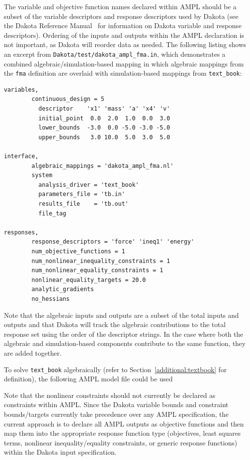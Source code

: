 The variable and objective function names declared within AMPL should
be a subset of the variable descriptors and response descriptors used
by Dakota (see the Dakota Reference Manual~\cite{RefMan} for information
on Dakota variable and response descriptors).  Ordering of the inputs
and outputs within the AMPL declaration is not important, as Dakota
will reorder data as needed.  The following listing shows an excerpt
from \texttt{Dakota/test/dakota\_ampl\_fma.in}, which demonstrates a
combined algebraic/simulation-based mapping in which algebraic
mappings from the \texttt{fma} definition are overlaid with
simulation-based mappings from \texttt{text\_book}:
\begin{center}
\begin{bigbox}
\begin{small}
\begin{verbatim}
variables,
        continuous_design = 5
          descriptor    'x1' 'mass' 'a' 'x4' 'v'
          initial_point  0.0  2.0  1.0  0.0  3.0
          lower_bounds  -3.0  0.0 -5.0 -3.0 -5.0
          upper_bounds   3.0 10.0  5.0  3.0  5.0

interface,
        algebraic_mappings = 'dakota_ampl_fma.nl'
        system
          analysis_driver = 'text_book'
          parameters_file = 'tb.in'
          results_file    = 'tb.out'
          file_tag

responses,
        response_descriptors = 'force' 'ineq1' 'energy'
        num_objective_functions = 1
        num_nonlinear_inequality_constraints = 1
        num_nonlinear_equality_constraints = 1
        nonlinear_equality_targets = 20.0
        analytic_gradients
        no_hessians
\end{verbatim}
\end{small}
\end{bigbox}
\end{center}
Note that the algebraic inputs and outputs are a subset of the total
inputs and outputs and that Dakota will track the algebraic
contributions to the total response set using the order of the
descriptor strings.  In the case where both the algebraic and
simulation-based components contribute to the same function, they are
added together.

To solve \texttt{text\_book} algebraically (refer to
Section~\ref{additional:textbook} for definition), the
following AMPL model file could be used
\begin{center}
\begin{bigbox}
\begin{small}
\end{small}
\end{bigbox}
\end{center}
Note that the nonlinear constraints should not currently be declared
as constraints within AMPL.  Since the Dakota variable bounds and
constraint bounds/targets currently take precedence over any AMPL
specification, the current approach is to declare all AMPL outputs as
objective functions and then map them into the appropriate response
function type (objectives, least squares terms, nonlinear
inequality/equality constraints, or generic response functions) within
the Dakota input specification.

